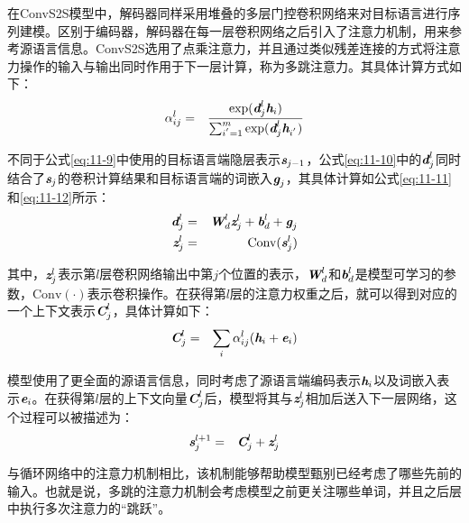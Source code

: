 \parinterval 在ConvS2S模型中，解码器同样采用堆叠的多层门控卷积网络来对目标语言进行序列建模。区别于编码器，解码器在每一层卷积网络之后引入了注意力机制，用来参考源语言信息。ConvS2S选用了点乘注意力，并且通过类似残差连接的方式将注意力操作的输入与输出同时作用于下一层计算，称为多跳注意力。其具体计算方式如下：
\begin{eqnarray}
\alpha_{ij}^l &=& \frac{ \textrm{exp} (\textbf{\em d}_{j}^l\textbf{\em h}_i) }{\sum_{i^{'}=1}^m \textrm{exp} (\textbf{\em d}_{j}^l\textbf{\em h}_{i^{'}})}
\label{eq:11-10}
\end{eqnarray}

\noindent 不同于公式\eqref{eq:11-9}中使用的目标语言端隐层表示$\textbf{\em s}_{j-1}$，公式\eqref{eq:11-10}中的$\textbf{\em d}_{j}^l$同时结合了$\textbf{\em s}_{j}$的卷积计算结果和目标语言端的词嵌入$\textbf{\em g}_j$，其具体计算如公式\eqref{eq:11-11}和\eqref{eq:11-12}所示：
\begin{eqnarray}
\textbf{\em d}_{j}^l &=& \textbf{\em W}_{d}^{l} \textbf{\em z}_{j}^{l} + \textbf{\em b}_{d}^{l} + \textbf{\em g}_j \label{eq:11-11} \\
\textbf{\em z}_j^l &=& \textrm{Conv}(\textbf{\em s}_j^l) \label{eq:11-12}
\end{eqnarray}

\noindent 其中，$\textbf{\em z}_j^l$表示第$l$层卷积网络输出中第$j$个位置的表示，$\textbf{\em W}_{d}^{l}$和$\textbf{\em b}_{d}^{l}$是模型可学习的参数，$\textrm{Conv}(\cdot)$表示卷积操作。在获得第$l$层的注意力权重之后，就可以得到对应的一个上下文表示$\textbf{\em C}_j^l$，具体计算如下：
\begin{eqnarray}
\textbf{\em C}_j^l &=& \sum_i \alpha_{ij}^l (\textbf{\em h}_i + \textbf{\em e}_i)
\label{eq:11-13}
\end{eqnarray}

\noindent 模型使用了更全面的源语言信息，同时考虑了源语言端编码表示$\textbf{\em h}_i$以及词嵌入表示$\textbf{\em e}_i$。在获得第$l$层的上下文向量$\textbf{\em C}_j^l$后，模型将其与$\textbf{\em z}_j^l$相加后送入下一层网络，这个过程可以被描述为：
\begin{eqnarray}
\textbf{\em s}_j^{l+1} &=& \textbf{\em C}_j^l + \textbf{\em z}_j^l
\label{eq:11-14}
\end{eqnarray}

\noindent 与循环网络中的注意力机制相比，该机制能够帮助模型甄别已经考虑了哪些先前的输入。也就是说，多跳的注意力机制会考虑模型之前更关注哪些单词，并且之后层中执行多次注意力的“跳跃”。


